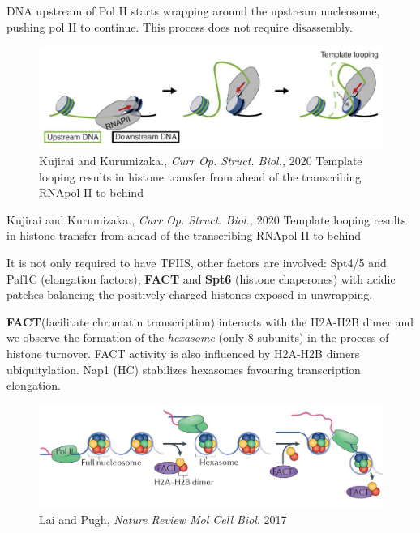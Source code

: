 DNA upstream of Pol II starts wrapping around the upstream nucleosome, pushing pol II to continue. This process does not require disassembly.

\begin{figure}
\centering
\includegraphics[width=\textwidth]{../_resources/Screenshot_2022-10-05_at_23-04-42.png}
\caption{Kujirai and Kurumizaka., \emph{Curr Op. Struct. Biol.,} 2020
Template looping results in histone transfer from ahead of the transcribing RNApol II to behind}
\end{figure}

Kujirai and Kurumizaka., \emph{Curr Op. Struct. Biol.,} 2020
Template looping results in histone transfer from ahead of the transcribing RNApol II to behind

It is not only required to have TFIIS, other factors are involved: Spt4/5 and Paf1C (elongation factors), \textbf{FACT} and \textbf{Spt6} (histone chaperones) with acidic patches balancing the positively charged histones exposed in unwrapping.

\textbf{FACT}(facilitate chromatin transcription) interacts with the H2A-H2B dimer and we observe the formation of the \emph{hexasome} (only 8 subunits) in the process of histone turnover. FACT activity is also influenced by H2A-H2B dimers ubiquitylation. Nap1 (HC) stabilizes hexasomes favouring transcription elongation.

\begin{figure}
\centering
\includegraphics[width=\textwidth]{../_resources/Screenshot_2022-10-05_at_23-05-01.png}
\caption{Lai and Pugh, \emph{Nature Review Mol Cell Biol}. 2017}
\end{figure}

